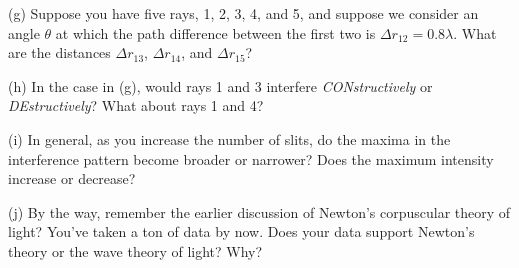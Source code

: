 \pagebreak[2]
(g) Suppose you have five rays, 1, 2, 3, 4, and 5, and suppose we consider an angle $\theta$ at which the path difference between the first two is $\Delta r_{12} = 0.8\lambda$.  What are the distances $\Delta r_{13}$, $\Delta r_{14}$, and $\Delta r_{15}$?
\answerspace{0.6in}

(h) In the case in (g), would rays 1 and 3 interfere \textit{CONstructively} or \textit{DEstructively}?  What about rays 1 and 4?
\answerspace{0.8in}

(i) In general, as you increase the number of slits, do the maxima in the interference pattern become broader or narrower?  Does the maximum intensity increase or decrease?
\answerspace{0.8in}

(j) By the way, remember the earlier discussion of Newton's corpuscular theory of
light? You've taken a ton of data by now.  Does your data support Newton's theory or the wave theory of light?
Why?
\answerspace{1.0in}





